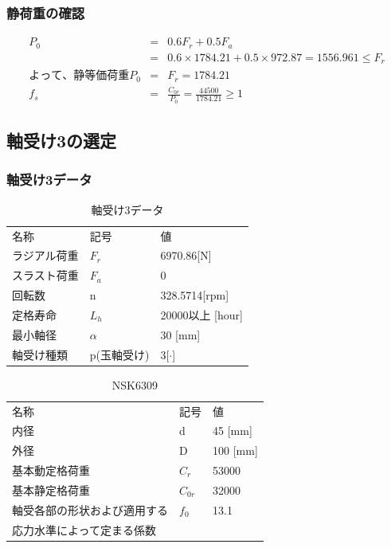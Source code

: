 \documentclass[a4j,twoside,openright,11pt]{jreport}
\begin{document}
\subsubsection{静荷重の確認}
\begin{eqnarray}
P_0&=&0.6F_r+0.5F_a\\
&=&0.6 \times 1784.21 + 0.5 \times 972.87 = 1556.961 \leq F_r\\
よって、静等価荷重P_0 &=& F_r =1784.21\\
f_s &=& \frac{C_{0r}}{P_0} = \frac{44500}{1784.21}\geq 1
\end{eqnarray}











\newpage
\subsection{軸受け3の選定}

\subsubsection{軸受け3データ}
\begin{table}[htb]
\begin{center}
  \caption{軸受け3データ}
  \begin{tabular}{lll} \hline
名称&記号&値\\
ラジアル荷重&$F_r$&6970.86[N]\\
スラスト荷重&$F_a$&0\\
回転数&n&328.5714[rpm]\\
定格寿命&$L_h$&20000以上 [hour]\\
最小軸径&$\alpha$&30 [mm]\\
軸受け種類&p(玉軸受け)&3[$\cdot$]\\
\hline
  \end{tabular}
\end{center}
\end{table}

\begin{table}[htb]
\begin{center}
  \caption{NSK6309}
  \begin{tabular}{lll} \hline
名称&記号&値\\
内径& d &45 [mm]\\
外径& D &100 [mm]\\
基本動定格荷重&$C_{r}$&53000\\
基本静定格荷重&$C_{0r}$&32000\\
軸受各部の形状および適用する&$f_0$&13.1\\
応力水準によって定まる係数&&\\
\hline
  \end{tabular}
\end{center}
\end{table}
\end{document}
